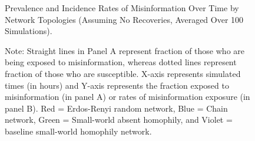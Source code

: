 \documentclass[man, 12pt, a4paper, nolmodern, noextraspace]{apa6}
\begin{document}
\begin{figure}
    \captionsetup{format=hang}
    \caption{Prevalence and Incidence Rates of Misinformation Over Time by Network Topologies (Assuming No Recoveries, Averaged Over 100 Simulations).} 
    \label{fig:Figure2}
    \captionsetup{font=small}
    \caption*{Note: Straight lines in Panel A represent fraction of those who are being exposed to misinformation, whereas dotted lines represent fraction of those who are susceptible. X-axis represents simulated times (in hours) and Y-axis represents the fraction exposed to misinformation (in panel A) or rates of misinformation exposure (in panel B). Red = Erdos-Renyi random network, Blue = Chain network, Green = Small-world absent homophily, and Violet = baseline small-world homophily network.} 
\end{figure}          
        
\end{document}
